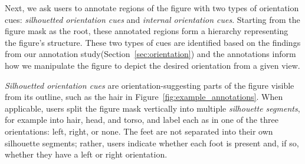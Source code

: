 Next, we ask users to annotate regions of the figure with two types of orientation cues: \textit{silhouetted orientation cues} and \textit{internal orientation cues}. Starting from the figure mask as the root, these annotated regions form a hierarchy representing the figure's structure.
These two types of cues are identified based on the findings from our annotation study(Section~\ref{sec:orientation}) and the annotations inform how we manipulate the figure to depict the desired orientation from a given view.



\textit{Silhouetted orientation cues} are orientation-suggesting parts of the figure visible from its outline, such as the hair in Figure~\ref{fig:example_annotations}. When applicable, users split the figure mask vertically into multiple \textit{silhouette segments}, for example into hair, head, and torso, and label each as in one of the three orientations: left, right, or none.
The feet are not separated into their own silhouette segments; rather, users indicate whether each foot is present and, if so, whether they have a left or right orientation.%


